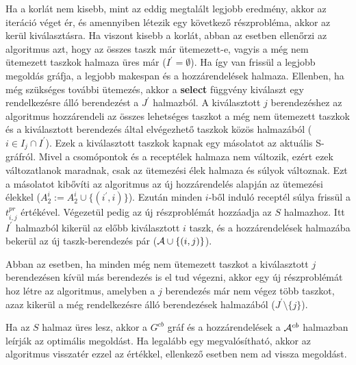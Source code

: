 Ha a korlát nem kisebb, mint az eddig megtalált legjobb eredmény, akkor az iteráció véget ér, és amennyiben létezik egy következő részprobléma, akkor az kerül kiválasztásra.
Ha viszont kisebb a korlát, abban az esetben ellenőrzi az algoritmus azt, hogy az összes taszk már ütemezett-e, vagyis a még nem ütemezett taszkok halmaza üres már ($I^{'}=\emptyset$). Ha így van frissül a legjobb megoldás gráfja, a legjobb makespan és a hozzárendelések halmaza. Ellenben, ha még szükséges további ütemezés, akkor a  \textbf{select} függvény kiválaszt egy rendelkezésre álló berendezést a $J^{'}$ halmazból. A kiválasztott $j$ berendezéshez az algoritmus hozzárendeli az összes lehetséges taszkot a még nem ütemezett taszkok és a kiválasztott berendezés által elvégezhető taszkok közös halmazából ($i \in I_{j} \cap I^{'}$). Ezek a kiválasztott taszkok kapnak egy másolatot az aktuális S-gráfról. Mivel a csomópontok és a receptélek halmaza nem változik, ezért ezek változatlanok maradnak, csak az ütemezési élek halmaza és súlyok változnak. Ezt a másolatot kibővíti az algoritmus az új hozzárendelés alapján az ütemezési élekkel ($A^{i}_{2}:= A^{i}_{2} \cup \{(i^{'},i)\}$). Ezután minden $i$-ből induló receptél súlya frissül a $t^{pr}_{i,j}$ értékével. Végezetül pedig az új részproblémát hozzáadja az $S$ halmazhoz. Itt $I^{'}$ halmazból kikerül az előbb kiválasztott $i$ taszk, és a hozzárendelések halmazába bekerül az új taszk-berendezés pár (${\cal A}\cup\{(i,j)\}$).

Abban az esetben, ha minden még nem ütemezett taszkot a kiválasztott $j$ berendezésen kívül más berendezés is el tud végezni, akkor egy új részproblémát hoz létre az algoritmus, amelyben a $j$ berendezés már nem végez több taszkot, azaz kikerül a még rendelkezésre álló berendezések halmazából ($J^{'}\setminus\{j\}$).

Ha az $S$ halmaz üres lesz, akkor a $G^{cb}$ gráf és a hozzárendelések a ${\cal A}^{cb}$ halmazban leírják az optimális megoldást. Ha legalább egy megvalósítható, akkor az algoritmus visszatér ezzel az értékkel, ellenkező esetben nem ad vissza megoldást.


